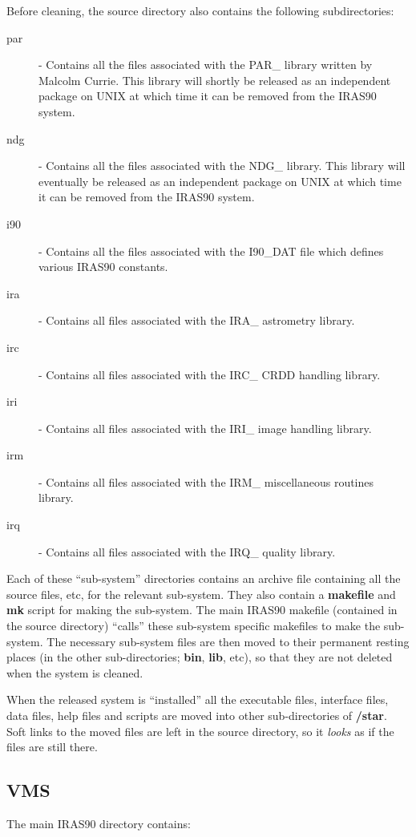 Before cleaning, the source directory also contains the following 
subdirectories:
\begin{description}
\item [par] - Contains all the files associated with the {\small PAR\_} library
written by Malcolm Currie. This library will shortly be released as an
independent package on {\small UNIX} at which time it can be removed from the
{\small IRAS90} system. 
\item [ndg] - Contains all the files associated with the {\small NDG\_} library.
This library will eventually be released as an independent package on {\small
UNIX} at which time it can be removed from the {\small IRAS90} system. 
\item [i90] - Contains all the files associated with the {\small I90\_DAT} file 
which defines various {\small IRAS90} constants.
\item [ira] - Contains all files associated with the {\small IRA\_} astrometry 
library.
\item [irc] - Contains all files associated with the {\small IRC\_ CRDD} handling
library.
\item [iri] - Contains all files associated with the {\small IRI\_} image handling
library.
\item [irm] - Contains all files associated with the {\small IRM\_} miscellaneous 
routines library.
\item [irq] - Contains all files associated with the {\small IRQ\_} quality
library.
\end{description}

Each of these ``sub-system'' directories contains an archive file containing all the source 
files, etc, for the relevant sub-system. They also contain a {\bf makefile} and
{\bf mk} script for making the sub-system. The main {\small IRAS90} makefile
(contained in the source directory)
``calls'' these sub-system specific makefiles to make the sub-system. The
necessary sub-system files are then moved to their permanent resting places
(in the other sub-directories; {\bf bin}, {\bf lib}, etc), so that they are not
deleted when the system is cleaned. 

When the released system is ``installed'' all the executable files, interface
files, data files, help files and scripts are moved into other sub-directories
of {\bf /star}. Soft links to the moved files are left in the source directory,
so it {\em looks} as if the files are still there. 


\subsection{VMS}
The main {\small IRAS90} directory contains:

